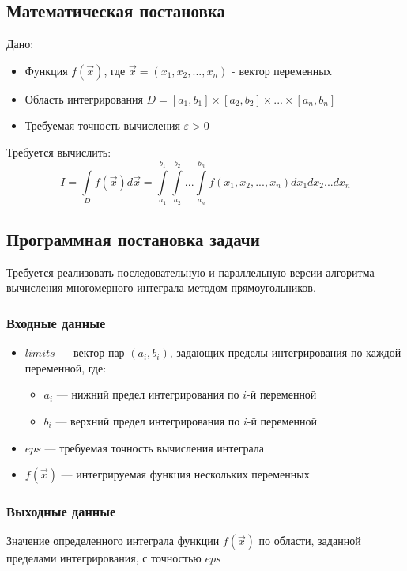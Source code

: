 \documentclass[12pt]{article}
\begin{document}
\subsection{Математическая постановка}

Дано:
\begin{itemize}
    \item Функция $f(\vec{x})$, где $\vec{x} = (x_1, x_2, ..., x_n)$ - вектор переменных
    \item Область интегрирования $D = [a_1, b_1] \times [a_2, b_2] \times ... \times [a_n, b_n]$
    \item Требуемая точность вычисления $\varepsilon > 0$
\end{itemize}

Требуется вычислить:
\[
I = \int\limits_D f(\vec{x})d\vec{x} = \int\limits_{a_1}^{b_1}\int\limits_{a_2}^{b_2}...\int\limits_{a_n}^{b_n} f(x_1,x_2,...,x_n)dx_1dx_2...dx_n
\]
\subsection{Программная постановка задачи}

Требуется реализовать последовательную и параллельную версии алгоритма вычисления многомерного интеграла методом прямоугольников.

\subsubsection{Входные данные}
\begin{itemize}
    \item $limits$ --- вектор пар $(a_i, b_i)$, задающих пределы интегрирования по каждой переменной, где:
    \begin{itemize}
        \item $a_i$ --- нижний предел интегрирования по $i$-й переменной
        \item $b_i$ --- верхний предел интегрирования по $i$-й переменной
    \end{itemize}
    \item $eps$ --- требуемая точность вычисления интеграла
    \item $f(\vec{x})$ --- интегрируемая функция нескольких переменных
\end{itemize}

\subsubsection{Выходные данные}
Значение определенного интеграла функции $f(\vec{x})$ по области, заданной пределами интегрирования, с точностью $eps$
\end{document}
